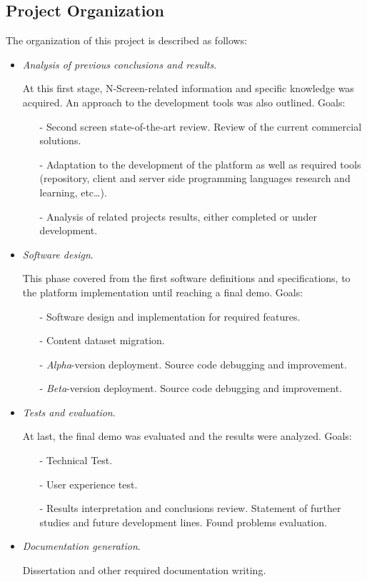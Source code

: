 \documentclass{acm_proc_article-sp}
\begin{document}
\subsection{Project Organization}
The organization of this project is described as follows:
\begin{itemize}
  \item \textit{Analysis of previous conclusions and results}. 
  
  At this first stage, N-Screen-related information and specific knowledge was acquired. An approach to the development tools was also outlined. Goals:
  \begin{itemize}
  	\item [-]Second screen state-of-the-art review. Review of the current commercial
solutions.
	\item [-]Adaptation to the development of the platform as well as required tools (repository, client and server side programming languages research and learning, etc\dots).
	\item [-]Analysis of related projects results, either completed or under development. 
  \end{itemize}
  
  \item \textit{Software design}.
  
  This phase covered from the first software definitions and  specifications, to the platform implementation until reaching a final demo. Goals:

  \begin{itemize}
  	\item [-]Software design and implementation for required features.
	\item [-]Content dataset migration. 
	\item [-]\textit{Alpha}-version deployment. Source code
debugging and improvement.
	\item [-]\textit{Beta}-version deployment. Source code
debugging and improvement.  
  \end{itemize}
	
  \item \textit{Tests and evaluation}. 
  
  At last, the final demo was evaluated and the results were analyzed. Goals:
  
  \begin{itemize}
  	\item [-]Technical Test.
	\item [-]User experience test.
	\item [-]Results interpretation and conclusions review. Statement of further studies and future development lines. Found problems evaluation.
  \end{itemize}
  
  \item \textit{Documentation generation}.
  
  Dissertation and other required documentation writing. 
\end{itemize}
\end{document}
